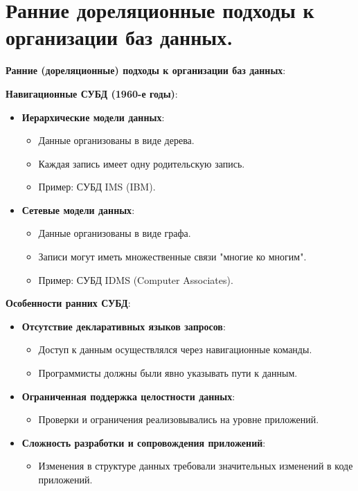 \documentclass[a4paper,12pt]{article}
\begin{document}
\section{Ранние дореляционные подходы к организации баз данных.}

\textbf{Ранние (дореляционные) подходы к организации баз данных}:

\textbf{Навигационные СУБД (1960-е годы)}:

\begin{itemize}
    \item \textbf{Иерархические модели данных}:
    \begin{itemize}
        \item Данные организованы в виде дерева.
        \item Каждая запись имеет одну родительскую запись.
        \item Пример: СУБД IMS (IBM).
    \end{itemize}
    \item \textbf{Сетевые модели данных}:
    \begin{itemize}
        \item Данные организованы в виде графа.
        \item Записи могут иметь множественные связи "многие ко многим".
        \item Пример: СУБД IDMS (Computer Associates).
    \end{itemize}
\end{itemize}

\textbf{Особенности ранних СУБД}:

\begin{itemize}
    \item \textbf{Отсутствие декларативных языков запросов}:
    \begin{itemize}
        \item Доступ к данным осуществлялся через навигационные команды.
        \item Программисты должны были явно указывать пути к данным.
    \end{itemize}
    \item \textbf{Ограниченная поддержка целостности данных}:
    \begin{itemize}
        \item Проверки и ограничения реализовывались на уровне приложений.
    \end{itemize}
    \item \textbf{Сложность разработки и сопровождения приложений}:
    \begin{itemize}
        \item Изменения в структуре данных требовали значительных изменений в коде приложений.
    \end{itemize}
\end{itemize}
\end{document}

